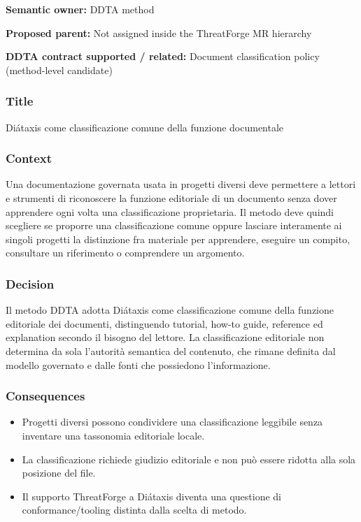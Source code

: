 \documentclass[
  10pt,
  a4paper,
]{article}
\providecommand{\tightlist}{%
  \setlength{\itemsep}{0pt}\setlength{\parskip}{0pt}}
\begin{document}
\textbf{Semantic owner:} DDTA method

\textbf{Proposed parent:} Not assigned inside the ThreatForge MR
hierarchy

\textbf{DDTA contract supported / related:} Document classification
policy (method-level candidate)

\subsubsection{Title}\label{title}

Diátaxis come classificazione comune della funzione documentale

\subsubsection{Context}\label{context}

Una documentazione governata usata in progetti diversi deve permettere a
lettori e strumenti di riconoscere la funzione editoriale di un
documento senza dover apprendere ogni volta una classificazione
proprietaria. Il metodo deve quindi scegliere se proporre una
classificazione comune oppure lasciare interamente ai singoli progetti
la distinzione fra materiale per apprendere, eseguire un compito,
consultare un riferimento o comprendere un argomento.

\subsubsection{Decision}\label{decision}

Il metodo DDTA adotta Diátaxis come classificazione comune della
funzione editoriale dei documenti, distinguendo tutorial, how-to guide,
reference ed explanation secondo il bisogno del lettore. La
classificazione editoriale non determina da sola l'autorità semantica
del contenuto, che rimane definita dal modello governato e dalle fonti
che possiedono l'informazione.

\subsubsection{Consequences}\label{consequences}

\begin{itemize}
\tightlist
\item
  Progetti diversi possono condividere una classificazione leggibile
  senza inventare una tassonomia editoriale locale.
\item
  La classificazione richiede giudizio editoriale e non può essere
  ridotta alla sola posizione del file.
\item
  Il supporto ThreatForge a Diátaxis diventa una questione di
  conformance/tooling distinta dalla scelta di metodo.
\end{itemize}
\end{document}
